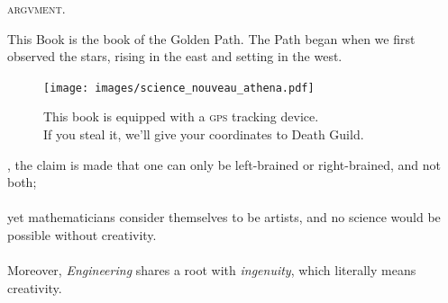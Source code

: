 \begin{center}
\booktitlefont\textsc{argvment.}
\end{center}
\begin{center}
\parbox{4.67in}{%
\begin{bookcomment}
This Book is the book of the Golden Path. The Path began when we first observed the stars, rising in the east and setting in the west. \\
\end{bookcomment}
}%
\vfill
\begin{figure}[h]
\begin{minipage}{0.3\textwidth}
    \centering
    \texttt{[image: images/science\_nouveau\_athena.pdf]}
\end{minipage}\hfill
\begin{minipage}{0.7\textwidth}
\begin{center}
This book is equipped with a \textsc{gps} tracking device.\\
\bigskip
If you steal it, we'll give your coordinates to Death Guild.
\end{center}
\end{minipage}
\end{figure}
\end{center}

\bversenonum {}, the claim is made that one can only be left-brained or right-brained, and not both; \\
\\
\bverse yet mathematicians consider themselves to be artists, and no science would be possible without creativity. \\
\\
\bverse Moreover, \textit{Engineering} shares a root with \textit{ingenuity}, which literally means creativity. \\

